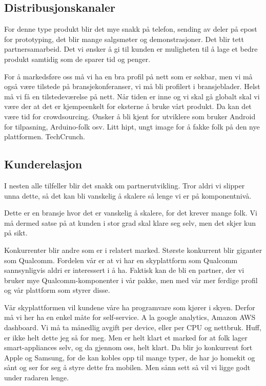 \subsection{Distribusjonskanaler}

For denne type produkt blir det mye snakk på telefon, sending av deler på epost
for prototyping, det blir mange salgsmøter og demonstrasjoner. Det blir tett
partnersamarbeid. Det vi ønsker å gi til kunden er muligheten til å lage et
bedre produkt samtidig som de sparer tid og penger.

For å markedsføre oss må vi ha en bra profil på nett som er søkbar, men vi må
også være tilstede på bransjekonferanser, vi må bli profilert i bransjeblader.
Helst må vi få en tilstedeværelse på nett. Når tiden er inne og vi skal gå
globalt skal vi være der at det er kjempeenkelt for eksterne å bruke vårt
produkt. Da kan det være tid for crowdsourcing. Ønsker å bli kjent for
utviklere som bruker Android for tilpasning, Arduino-folk osv. Litt hipt, ungt
image for å fakke folk på den nye plattformen. TechCrunch.

\subsection{Kunderelasjon}

I nesten alle tilfeller blir det snakk om partnerutvikling. Tror aldri vi
slipper unna dette, så det kan bli vanskelig å skalere så lenge vi er på
komponentnivå.

Dette er en bransje hvor det er vanskelig å skalere, for det krever mange folk.
Vi må dermed satse på at kunden i stor grad skal klare seg selv, men det skjer
kun på sikt.

Konkurrenter blir andre som er i relatert marked. Største konkurrent blir
giganter som Qualcomm. Fordelen vår er at vi har en skyplattform som Qualcomm
sannsynligvis aldri er interessert i å ha. Faktisk kan de bli en partner, der
vi bruker mye Qualcomm-komponenter i vår pakke, men med vår mer ferdige profil
og vår plattform som styrer disse.

Vår skyplattformen vil kundene våre ha programvare som kjører i skyen. Derfor
må vi her ha en enkel måte for self-service. A la google analytics, Amazon AWS
dashboard. Vi må ta månedlig avgift per device, eller per CPU og nettbruk.
Huff, er ikke helt dette jeg så for meg. Men er helt klart et marked for at
folk lager smart-appliances selv, og da gjennom oss, helt klart. Da blir jo
konkurrent fort Apple og Samsung, for de kan kobles opp til mange typer, de har
jo homekit og sånt og ser for seg å styre dette fra mobilen.
Men sånn sett så vil vi ligge godt under radaren lenge.
